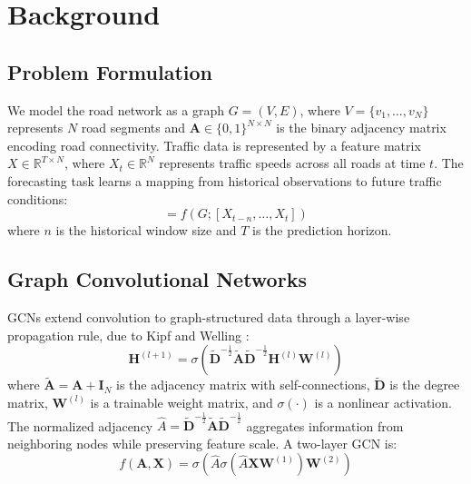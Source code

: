 \section{Background}\label{sec:bg}

\subsection{Problem Formulation}

We model the road network as a graph $G=(V,E)$, where $V=\{v_1,\ldots,v_N\}$ represents $N$ road segments and $\mathbf{A} \in \{0,1\}^{N \times N}$ is the binary adjacency matrix encoding road connectivity. Traffic data is represented by a feature matrix $X \in \mathbb{R}^{T \times N}$, where $X_t \in \mathbb{R}^N$ represents traffic speeds across all roads at time $t$. The forecasting task learns a mapping from historical observations to future traffic conditions:
\begin{equation}
[X_{t+1},\ldots,X_{t+T}] = f(G;[X_{t-n},\ldots,X_t])
\end{equation}
where $n$ is the historical window size and $T$ is the prediction horizon.

\subsection{Graph Convolutional Networks}

GCNs extend convolution to graph-structured data through a layer-wise propagation rule, due to Kipf and Welling \citep{kipf2017semi}:
\begin{equation}
\mathbf{H}^{(l+1)}= \sigma\!\left(\tilde{\mathbf{D}}^{-\frac{1}{2}} \tilde{\mathbf{A}}\tilde{\mathbf{D}}^{-\frac{1}{2}}\mathbf{H}^{(l)} \mathbf{W}^{(l)} \right)
\label{eq:gcn-layer}
\end{equation}
where $\tilde{\mathbf{A}} = \mathbf{A} + \mathbf{I}_N$ is the adjacency matrix with self-connections, $\tilde{\mathbf{D}}$ is the degree matrix, $\mathbf{W}^{(l)}$ is a trainable weight matrix, and $\sigma(\cdot)$ is a nonlinear activation. The normalized adjacency $\hat{A}=\tilde{\mathbf{D}}^{-\frac{1}{2}} \tilde{\mathbf{A}}\tilde{\mathbf{D}}^{-\frac{1}{2}}$ aggregates information from neighboring nodes while preserving feature scale. A two-layer GCN is:
\begin{equation}
f(\mathbf{A},\mathbf{X})=\sigma\!\left(\hat{A}\sigma\!\left(\hat{A}\mathbf{X} \mathbf{W}^{(1)} \right) \mathbf{W}^{(2)} \right)
\label{eq:two-layer-gcn}
\end{equation}

